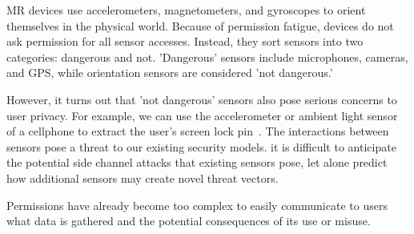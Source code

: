 MR devices use accelerometers, magnetometers, and gyroscopes to orient themselves in the physical world. Because of permission fatigue, devices do not ask permission for all sensor accesses. Instead, they sort sensors into two categories: dangerous and not. 'Dangerous' sensors include microphones, cameras, and GPS, while orientation sensors are considered 'not dangerous.'

However, it turns out that 'not dangerous' sensors also pose serious concerns to user privacy. For example, we can use the accelerometer or ambient light sensor of a cellphone to extract the user's screen lock pin~\cite{aviv2012practicality, spreitzer2018systematic}. The interactions between sensors pose a threat to our existing security models. it is difficult to anticipate the potential side channel attacks that existing sensors pose, let alone predict how additional sensors may create novel threat vectors.

Permissions have already become too complex to easily communicate to users what data is gathered and the potential consequences of its use or misuse.
